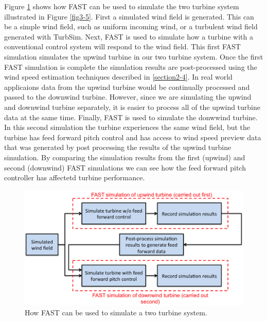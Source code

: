 Figure \ref{fig3-6} shows how FAST can be used to simulate the two turbine system illustrated in Figure \ref{fig3-5}. First a simulated wind field is generated. This can be a simple wind field, such as  uniform incoming wind, or a turbulent wind field generated with TurbSim. Next, FAST is used to simulate how a turbine with a conventional control system will respond to the  wind field. This first FAST simulation simulates the upwind turbine in our two turbine system. Once the first FAST simulation is complete the simulation results are post-processed using the wind speed estimation techniques described in \ref{section2-4}. In real world applicaions data from the upwind turbine would be continually processed and passed to the downwind turbine. However, since we are simulating the upwind and downwind turbine separately, it is easier to process all of the upwind turbine data at the same time. Finally, FAST is used to simulate the donwwind turbine. In this second simulation the turbine experiences the same wind field, but the turbine has feed forward pitch control and has access to wind speed preview data that was generated by post processing the results of the upwind turbine simulation. By comparing the simulation results from the first (upwind) and second (downwind) FAST simulations we can see how the feed forward pitch controller has affectetd turbine performance.

 \begin{figure}[htbp]
	\centering
		\includegraphics[width=\linewidth]{Figures/ch3Figures/fig3-6.png}
		
	\caption{How FAST can be used to simulate a two turbine system.}
	\label{fig3-6}
\end{figure}



